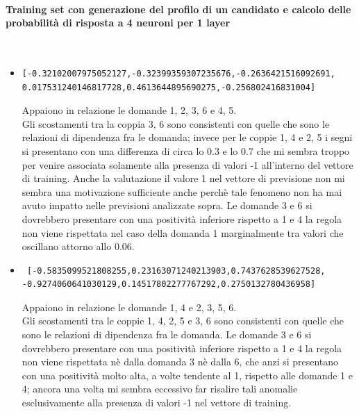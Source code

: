 \paragraph{Training set con generazione del profilo di un candidato e calcolo delle probabilit\`a di risposta a 4 neuroni per 1 layer}\mbox{}
\label{Training set con generazione del profilo di un candidato e calcolo delle probabilita di risposta a 4 neuroni per 1 layer}
\\
\noindent
\begin{itemize}
\item \begin{verbatim}[-0.32102007975052127,-0.32399359307235676,-0.2636421516092691,
0.017531240146817728,0.4613644895690275,-0.256802416831004]
\end{verbatim}
Appaiono in relazione le domande 1, 2, 3, 6  e 4, 5.\\
Gli scostamenti tra la coppia 3, 6 sono consistenti con quelle che sono le relazioni di dipendenza fra le domanda; invece per le coppie 1, 4 e 2, 5 i segni si presentano con una differenza di circa lo 0.3 e lo  0.7 che mi sembra troppo per venire associata solamente alla presenza di valori -1 all'interno del vettore di training. Anche la valutazione il valore 1 nel vettore di previsione non mi sembra una motivazione sufficiente anche perch\`e tale fenomeno non ha mai avuto impatto nelle previsioni analizzate sopra.
Le domande 3 e 6 si dovrebbero presentare con una positivit\`a inferiore rispetto a 1 e 4 la regola non viene rispettata nel caso della domanda 1 marginalmente tra valori che oscillano attorno allo 0.06.

\item \begin{verbatim} [-0.5835099521808255,0.23163071240213903,0.7437628539627528,
-0.9274060641030129,0.14517802277767292,0.2750132780436958]
\end{verbatim}
Appaiono in relazione le domande 1, 4 e 2, 3, 5, 6.\\
Gli scostamenti tra le coppie 1, 4, 2, 5 e 3, 6 sono consistenti con quelle che sono le relazioni di dipendenza fra le domanda.
Le domande 3 e 6 si dovrebbero presentare con una positivit\`a inferiore rispetto a 1 e 4 la regola non viene rispettata n\`e dalla domanda 3 n\`e dalla 6, che anzi si presentano con una positivit\`a molto alta, a volte tendente al 1, rispetto alle domande 1 e 4; ancora una volta mi sembra eccessivo far risalire tali anomalie esclusivamente alla presenza di valori -1 nel vettore di training.


\end{itemize}
